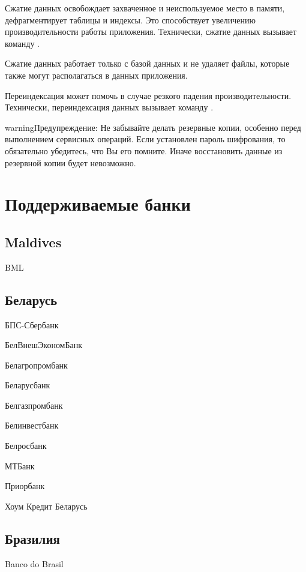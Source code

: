 \documentclass[a4paper,10pt,russian]{sphinxmanual}
\begin{document}
Сжатие данных освобождает захваченное и неиспользуемое место в памяти, дефрагментирует таблицы и индексы.
Это способствует увеличению производительности работы приложения. Технически, сжатие данных вызывает команду .

Сжатие данных работает только с базой данных и не удаляет файлы, которые также могут располагаться в данных приложения.

Переиндексация может помочь в случае резкого падения производительности. Технически, переиндексация данных вызывает
команду .

\begin{sphinxadmonition}{warning}{Предупреждение:}
Не забывайте делать резервные копии, особенно перед выполнением сервисных операций. Если установлен пароль шифрования, то обязательно убедитесь, что Вы его помните. Иначе восстановить данные из резервной копии будет невозможно.
\end{sphinxadmonition}


\chapter{Поддерживаемые банки}
\label{\detokenize{banks:chapter-supported-banks}}\label{\detokenize{banks:id1}}\label{\detokenize{banks::doc}}

\section{Maldives}
\label{\detokenize{banks:maldives}}
BML


\section{Беларусь}
\label{\detokenize{banks:id2}}
БПС-Сбербанк

БелВнешЭкономБанк

Белагропромбанк

Беларусбанк

Белгазпромбанк

Белинвестбанк

Белросбанк

МТБанк

Приорбанк

Хоум Кредит Беларусь


\section{Бразилия}
\label{\detokenize{banks:id3}}
Banco do Brasil
\end{document}
